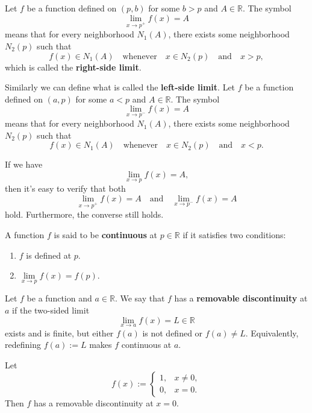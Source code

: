\documentclass[a4paper]{ctexart}
\begin{document}
	\begin{mydef}
		Let $f$ be a function defined on $(p,b)$ for some $b>p$ and $A\in \mathbb{R}$. The symbol
		\[
		\lim_{x\to p^+}f(x)=A
		\]
		means that for every neighborhood $N_1(A)$, there exists some neighborhood $N_2(p)$ such that
		\[
		f(x)\in N_1(A)\quad \text{whenever}\quad x\in N_2(p)\quad \text{and}\quad x>p,
		\]
		which is called the \textbf{right-side limit}.
		
		Similarly we can define what is called the \textbf{left-side limit}.
		Let $f$ be a function defined on $(a,p)$ for some $a<p$ and $A\in \mathbb{R}$. The symbol
		\[
		\lim_{x\to p^-}f(x)=A
		\]
		means that for every neighborhood $N_1(A)$, there exists some neighborhood $N_2(p)$ such that
		\[
		f(x)\in N_1(A)\quad \text{whenever}\quad x\in N_2(p)\quad \text{and}\quad x<p.
		\]
	\end{mydef}
	\begin{myrmk}
		If we have
		\[
		\lim_{x\to p}f(x)=A,
		\]
		then it's easy to verify that both
		\[
		\lim_{x\to p^+}f(x)=A\quad \text{and}\quad \lim_{x\to p^-}f(x)=A
		\]
		hold. Furthermore, the converse still holds.
	\end{myrmk}
	
	
	\begin{mydef}
		A function $f$ is said to be \textbf{continuous} at $p\in \mathbb{R}$ if it satisfies two conditions:
		\begin{enumerate}
			\item $f$ is defined at $p$.
			\item $\lim\limits_{x\to p}f(x)=f(p).$
		\end{enumerate}
	\end{mydef}
	
	\begin{mydef}
		Let $f$ be a function and $a\in\mathbb{R}$. We say that $f$ has a \textbf{removable discontinuity} at $a$ if the two-sided limit
		\[
		\lim_{x\to a} f(x)=L\in\mathbb{R}
		\]
		exists and is finite, but either $f(a)$ is not defined or $f(a)\neq L$. Equivalently, redefining $f(a):=L$ makes $f$ continuous at $a$.
	\end{mydef}
	
	\begin{myex}
		Let
		\[
		f(x):=
		\begin{cases}
			1, & x \neq 0,\\
			0,  & x = 0.
		\end{cases}
		\]
		Then $f$ has a removable discontinuity at $x=0$.
	\end{myex}
	
\end{document}
